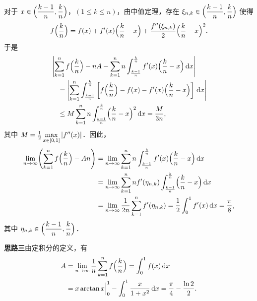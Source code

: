 \begin{solution}
对于 $x\in\Bigl(\dfrac{k-1}{n},\dfrac{k}{n}\Bigr)$，$(1\le k\le n)$，由中值定理，存在 $\xi_{n,k}\in\Bigl(\dfrac{k-1}{n},\dfrac{k}{n}\Bigr)$ 使得
\[
  f\Bigl(\frac{k}{n}\Bigr)=f(x)+f'(x)\Bigl(\frac{k}{n}-x\Bigr)
  +\frac{f''(\xi_{n,k})}{2}\Bigl(\frac{k}{n}-x\Bigr)^2 .
\]
于是
\begin{align*}
  &\left|\sum_{k=1}^{n}f\Bigl(\frac{k}{n}\Bigr)-nA
  -\sum_{k=1}^{n}n\int_{\frac{k-1}{n}}^{\frac{k}{n}}f'(x)\Bigl(\frac{k}{n}-x\Bigr)\,\mathrm{d} x\right|\\
  &\quad=\left|\sum_{k=1}^{n}\int_{\frac{k-1}{n}}^{\frac{k}{n}}
  \left[f\Bigl(\frac{k}{n}\Bigr)-f(x)-f'(x)\Bigl(\frac{k}{n}-x\Bigr)\right]\,\mathrm{d} x\right|\\
  &\quad\le M\sum_{k=1}^{n}n\int_{\frac{k-1}{n}}^{\frac{k}{n}}\Bigl(\frac{k}{n}-x\Bigr)^2\,\mathrm{d} x=\frac{M}{3n},
\end{align*}
其中 $M=\frac12\max\limits_{x\in[0,1]}\left|f''(x)\right|$．因此，
\begin{align*}
  \lim_{n\to\infty}\Biggl(\sum_{k=1}^{n}f\Bigl(\frac{k}{n}\Bigr)-An\Biggr)
  &=\lim_{n\to\infty}\sum_{k=1}^{n}n\int_{\frac{k-1}{n}}^{\frac{k}{n}}f'(x)\Bigl(\frac{k}{n}-x\Bigr)\,\mathrm{d} x\\
  &=\lim_{n\to\infty}\sum_{k=1}^{n}nf'(\eta_{n,k})\int_{\frac{k-1}{n}}^{\frac{k}{n}}\Bigl(\frac{k}{n}-x\Bigr)\,\mathrm{d} x\\
  &=\lim_{n\to\infty}\frac{1}{2n}\sum_{k=1}^{n}f'(\eta_{n,k})
  =\frac12\int_0^1 f'(x)\,\mathrm{d} x=\frac{\pi}{8},
\end{align*}
其中 $\eta_{n,k}\in\Bigl(\dfrac{k-1}{n},\dfrac{k}{n}\Bigr)$．

\textbf{思路三}\quad 由定积分的定义，有
\begin{align*}
  A&=\lim_{n\to\infty}\frac1n\sum_{k=1}^{n}f\Bigl(\frac{k}{n}\Bigr)=\int_0^1 f(x)\,\mathrm{d} x\\
   &=x\arctan x\Big|_0^1-\int_0^1\frac{x}{1+x^2}\,\mathrm{d} x=\frac{\pi}{4}-\frac{\ln 2}{2}.
\end{align*}


\end{solution}

